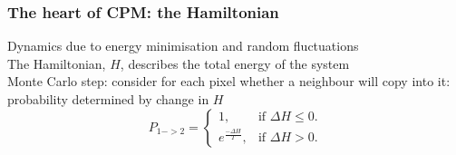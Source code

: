 \documentclass[compress]{beamer}
\begin{document}
\begin{frame} 
\frametitle{The heart of CPM: the Hamiltonian}
Dynamics due to energy minimisation and random fluctuations\\
The Hamiltonian, $H$, describes the total energy of the system\\ 
Monte Carlo step: consider for each pixel whether a neighbour will copy into it: probability determined by change in $H$\\

\begin{equation}
P_{1->2}=\begin{cases}
    1, & \text{if $\Delta H \leq 0$}.\\
    e^{\frac{-\Delta H}{T}}, & \text{if $\Delta H>0$}.
  \end{cases}
\end{equation}



\end{frame}
\end{document}
